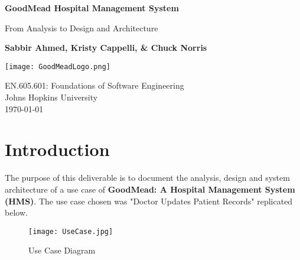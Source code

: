 \documentclass[a4paper, 11pt]{article}
\begin{document}

\begin{titlepage}
   \begin{center}
       \vspace*{1cm}

        \huge
        \textbf{GoodMead Hospital Management System}

        \vspace{0.5cm}

        \LARGE
        From Analysis to Design and Architecture

        \vspace{0.5cm}        
        \large
        \textbf{Sabbir Ahmed, Kristy Cappelli, \& Chuck Norris}

        \vfill

        \texttt{[image: GoodMeadLogo.png]}

        EN.605.601: Foundations of Software Engineering\\
        Johns Hopkins University\\
        \today

   \end{center}
\end{titlepage}


\tableofcontents

\newpage

\section{Introduction}

The purpose of this deliverable is to document the analysis, design and system architecture of a use case of \textbf{GoodMead: A Hospital Management System (HMS)}. The use case chosen was "Doctor Updates Patient Records" replicated below.
\begin{figure}[!htb]
    \centering
        \texttt{[image: UseCase.jpg]}
    \caption{Use Case Diagram}\label{fig:use_case_diagram}
\end{figure}
\end{document}
